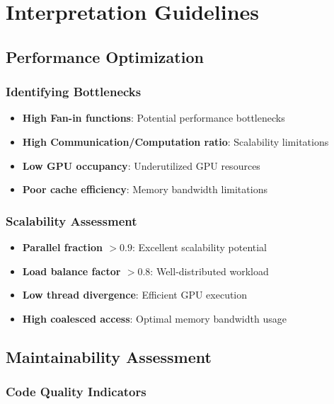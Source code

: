 \documentclass[11pt,a4paper]{article}
\begin{document}
\section{Interpretation Guidelines}

\subsection{Performance Optimization}

\subsubsection{Identifying Bottlenecks}

\begin{itemize}
    \item \textbf{High Fan-in functions}: Potential performance bottlenecks
    \item \textbf{High Communication/Computation ratio}: Scalability limitations
    \item \textbf{Low GPU occupancy}: Underutilized GPU resources
    \item \textbf{Poor cache efficiency}: Memory bandwidth limitations
\end{itemize}

\subsubsection{Scalability Assessment}

\begin{itemize}
    \item \textbf{Parallel fraction $> 0.9$}: Excellent scalability potential
    \item \textbf{Load balance factor $> 0.8$}: Well-distributed workload
    \item \textbf{Low thread divergence}: Efficient GPU execution
    \item \textbf{High coalesced access}: Optimal memory bandwidth usage
\end{itemize}

\subsection{Maintainability Assessment}

\subsubsection{Code Quality Indicators}
\end{document}
